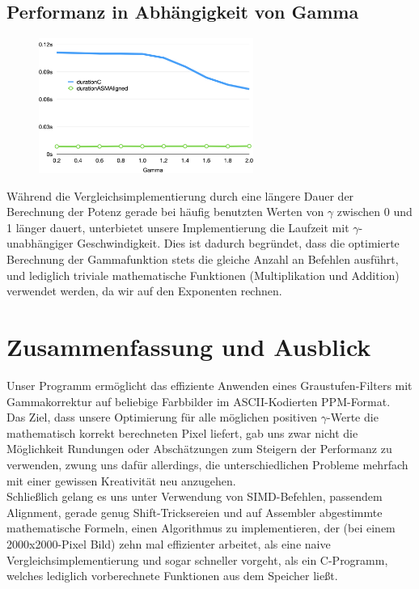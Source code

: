 \documentclass[course=erap]{aspdoc}
\begin{document}
	\subsection{Performanz in Abhängigkeit von Gamma}
	\begin{figure}
		\includegraphics[width=7cm]{Images/Gamma.png}
	\end{figure}
	Während die Vergleichsimplementierung durch eine längere Dauer der Berechnung der Potenz gerade bei häufig benutzten Werten von $\gamma$ zwischen 0 und 1 länger dauert, unterbietet unsere Implementierung die Laufzeit mit $\gamma$-unabhängiger Geschwindigkeit.
	Dies ist dadurch begründet, dass die optimierte Berechnung der Gammafunktion stets die gleiche Anzahl an Befehlen ausführt, und lediglich triviale mathematische Funktionen (Multiplikation und Addition) verwendet werden, da wir auf den Exponenten rechnen.
	

	
	
	\section{Zusammenfassung und Ausblick}
	Unser Programm ermöglicht das effiziente Anwenden eines Graustufen-Filters mit Gammakorrektur auf beliebige Farbbilder im ASCII-Kodierten PPM-Format.\\
	Das Ziel, dass unsere Optimierung für alle möglichen positiven $\gamma$-Werte die mathematisch korrekt berechneten Pixel liefert, gab uns zwar nicht die Möglichkeit Rundungen oder Abschätzungen zum Steigern der Performanz zu verwenden, zwung uns dafür allerdings, die unterschiedlichen Probleme mehrfach mit einer gewissen Kreativität neu anzugehen.\\
	Schließlich gelang es uns unter Verwendung von SIMD-Befehlen, passendem Alignment, gerade genug Shift-Tricksereien und auf Assembler abgestimmte mathematische Formeln, einen Algorithmus zu implementieren, der (bei einem 2000x2000-Pixel Bild) zehn mal effizienter arbeitet, als eine naive Vergleichsimplementierung und sogar schneller vorgeht, als ein C-Programm, welches lediglich vorberechnete Funktionen aus dem Speicher ließt.\\
\end{document}
